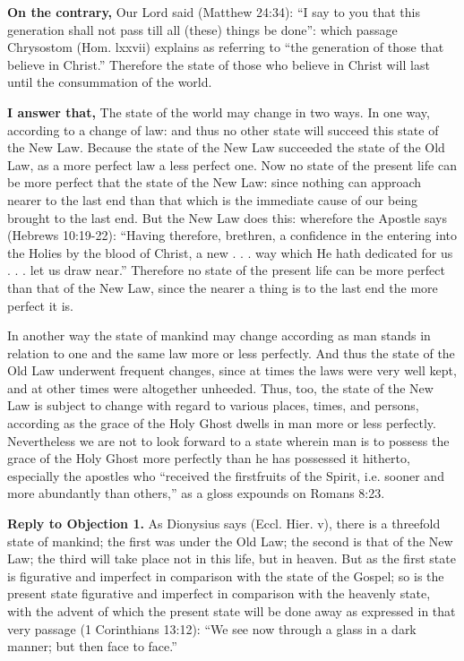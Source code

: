 \textbf{On the contrary,} Our Lord said (Matthew 24:34): ``I say to you that this generation shall not pass till all (these) things be done'': which passage Chrysostom (Hom. lxxvii) explains as referring to ``the generation of those that believe in Christ.'' Therefore the state of those who believe in Christ will last until the consummation of the world.

\textbf{I answer that,} The state of the world may change in two ways. In one way, according to a change of law: and thus no other state will succeed this state of the New Law. Because the state of the New Law succeeded the state of the Old Law, as a more perfect law a less perfect one. Now no state of the present life can be more perfect that the state of the New Law: since nothing can approach nearer to the last end than that which is the immediate cause of our being brought to the last end. But the New Law does this: wherefore the Apostle says (Hebrews 10:19-22): ``Having therefore, brethren, a confidence in the entering into the Holies by the blood of Christ, a new . . . way which He hath dedicated for us . . . let us draw near.'' Therefore no state of the present life can be more perfect than that of the New Law, since the nearer a thing is to the last end the more perfect it is.

In another way the state of mankind may change according as man stands in relation to one and the same law more or less perfectly. And thus the state of the Old Law underwent frequent changes, since at times the laws were very well kept, and at other times were altogether unheeded. Thus, too, the state of the New Law is subject to change with regard to various places, times, and persons, according as the grace of the Holy Ghost dwells in man more or less perfectly. Nevertheless we are not to look forward to a state wherein man is to possess the grace of the Holy Ghost more perfectly than he has possessed it hitherto, especially the apostles who ``received the firstfruits of the Spirit, i.e. sooner and more abundantly than others,'' as a gloss expounds on Romans 8:23.

\textbf{Reply to Objection 1.} As Dionysius says (Eccl. Hier. v), there is a threefold state of mankind; the first was under the Old Law; the second is that of the New Law; the third will take place not in this life, but in heaven. But as the first state is figurative and imperfect in comparison with the state of the Gospel; so is the present state figurative and imperfect in comparison with the heavenly state, with the advent of which the present state will be done away as expressed in that very passage (1 Corinthians 13:12): ``We see now through a glass in a dark manner; but then face to face.''

